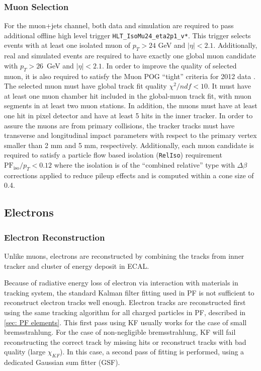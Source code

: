\subsubsection*{Muon Selection}
For the muon+jets channel, both data and simulation are required to pass additional offline high level trigger \texttt{HLT\_IsoMu24\_eta2p1\_v*}. This trigger selects events with at least one isolated muon of $p_T>24$ GeV and $|\eta|<2.1$.  Additionally, real and simulated events are required to have exactly one global muon candidate with $p_T>26$~GeV and $|\eta|<2.1$. In order to improve the quality of selected muon, it is also required to satisfy the Muon POG ``tight'' criteria for 2012 data \cite{Muon_POG}. The selected muon must have global track fit quality $\chi^2/ndf<10$. It must have at least one muon chamber hit included in the global-muon track fit, with muon segments in at least two muon stations. In addition, the muons must have at least one hit in pixel detector and have at least 5 hits in the inner tracker. In order to assure the muons are from primary collisions, the tracker tracks must have transverse and longitudinal impact parameters with respect to the primary vertex smaller than 2 mm and 5 mm, respectively.
Additionally, each muon candidate is required to satisfy a particle flow based isolation (\texttt{RelIso}) requirement $\mathrm{PF}_\mathrm{iso}/p_{T}<0.12$ where the isolation is of the ``combined relative'' type with $\Delta\beta$ corrections applied to reduce pileup effects and is computed within a cone size of 0.4. 

\subsection{Electrons}
\subsubsection*{Electron Reconstruction}
Unlike muons, electrons are reconstructed by combining the tracks from inner tracker and cluster of energy deposit in ECAL.  

Because of radiative energy loss of electron via interaction with materials in tracking system, the standard Kalman filter fitting used in PF is not sufficient to reconstruct electron tracks well enough. Electron tracks are reconstructed first using the same tracking algorithm for all charged particles in PF, described in \ref{sec: PF elements}. This first pass using KF usually works for the case of small bremsstrahlung. For the case of non-negligible bremsstrahlung, KF will fail reconstructing the correct track by missing hits or reconstruct tracks with bad quality (large $\chi_{KF}$). In this case, a second pass of fitting is performed, using a dedicated Gaussian sum fitter (GSF).

